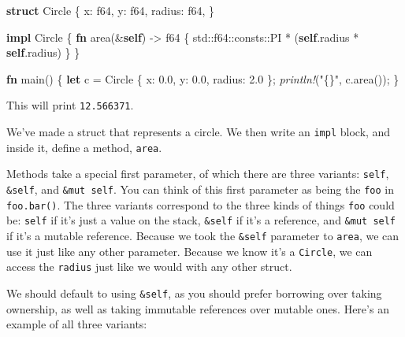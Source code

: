 \documentclass[a4paper,]{book}
\newenvironment{Shaded}{\begin{snugshade}}{\end{snugshade}}
\newcommand{\KeywordTok}[1]{\textcolor[rgb]{0.13,0.29,0.53}{\textbf{{#1}}}}
\newcommand{\DataTypeTok}[1]{\textcolor[rgb]{0.13,0.29,0.53}{{#1}}}
\newcommand{\DecValTok}[1]{\textcolor[rgb]{0.00,0.00,0.81}{{#1}}}
\newcommand{\StringTok}[1]{\textcolor[rgb]{0.31,0.60,0.02}{{#1}}}
\newcommand{\PreprocessorTok}[1]{\textcolor[rgb]{0.56,0.35,0.01}{\textit{{#1}}}}
\newcommand{\NormalTok}[1]{{#1}}
\begin{document}
\begin{Shaded}
\begin{Highlighting}[]
\KeywordTok{struct} \NormalTok{Circle \{}
    \NormalTok{x: }\DataTypeTok{f64}\NormalTok{,}
    \NormalTok{y: }\DataTypeTok{f64}\NormalTok{,}
    \NormalTok{radius: }\DataTypeTok{f64}\NormalTok{,}
\NormalTok{\}}

\KeywordTok{impl} \NormalTok{Circle \{}
    \KeywordTok{fn} \NormalTok{area(&}\KeywordTok{self}\NormalTok{) -> }\DataTypeTok{f64} \NormalTok{\{}
        \NormalTok{std::}\DataTypeTok{f64}\NormalTok{::consts::PI * (}\KeywordTok{self}\NormalTok{.radius * }\KeywordTok{self}\NormalTok{.radius)}
    \NormalTok{\}}
\NormalTok{\}}

\KeywordTok{fn} \NormalTok{main() \{}
    \KeywordTok{let} \NormalTok{c = Circle \{ x: }\DecValTok{0.0}\NormalTok{, y: }\DecValTok{0.0}\NormalTok{, radius: }\DecValTok{2.0} \NormalTok{\};}
    \PreprocessorTok{println!}\NormalTok{(}\StringTok{"\{\}"}\NormalTok{, c.area());}
\NormalTok{\}}
\end{Highlighting}
\end{Shaded}

This will print \texttt{12.566371}.

We've made a struct that represents a circle. We then write an
\texttt{impl} block, and inside it, define a method, \texttt{area}.

Methods take a special first parameter, of which there are three
variants: \texttt{self}, \texttt{\&self}, and \texttt{\&mut\ self}. You
can think of this first parameter as being the \texttt{foo} in
\texttt{foo.bar()}. The three variants correspond to the three kinds of
things \texttt{foo} could be: \texttt{self} if it's just a value on the
stack, \texttt{\&self} if it's a reference, and \texttt{\&mut\ self} if
it's a mutable reference. Because we took the \texttt{\&self} parameter
to \texttt{area}, we can use it just like any other parameter. Because
we know it's a \texttt{Circle}, we can access the \texttt{radius} just
like we would with any other struct.

We should default to using \texttt{\&self}, as you should prefer
borrowing over taking ownership, as well as taking immutable references
over mutable ones. Here's an example of all three variants:
\end{document}
